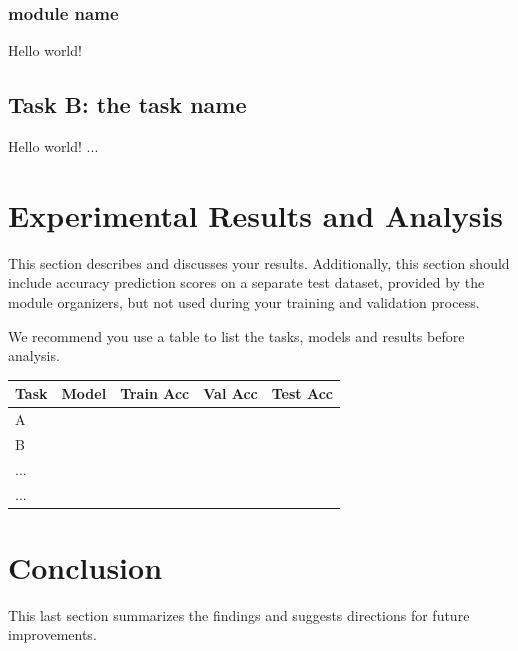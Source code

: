 \documentclass{article}
\begin{document}
    \subsubsection{module name}
    Hello world!
    \subsection{Task B: the task name}
    \label{ssec:imp_models_B}
    Hello world! ...
    

\section{Experimental Results and Analysis}
\label{sec:results}
    This section describes and discusses your results. Additionally, this section should include accuracy prediction scores on a separate test dataset, provided by the module organizers, but not used during your training and validation process.
    
    We recommend you use a table to list the tasks, models and results before analysis.
    

    \begin{table}[]
    \label{table:Table1}
    \begin{tabular}{@{}lllll@{}}
    \toprule
    Task & Model & Train Acc & Val Acc & Test Acc \\ \midrule
    A   &       &           &         &          \\
    B   &       &           &         &          \\
    ...   &       &           &         &          \\
    ...   &       &           &         &          \\ \bottomrule
    \end{tabular}
    \end{table}

\section{Conclusion}
\label{sec:conc}
    This last section summarizes the findings and suggests directions for future improvements.

\vfill\pagebreak



\end{document}
